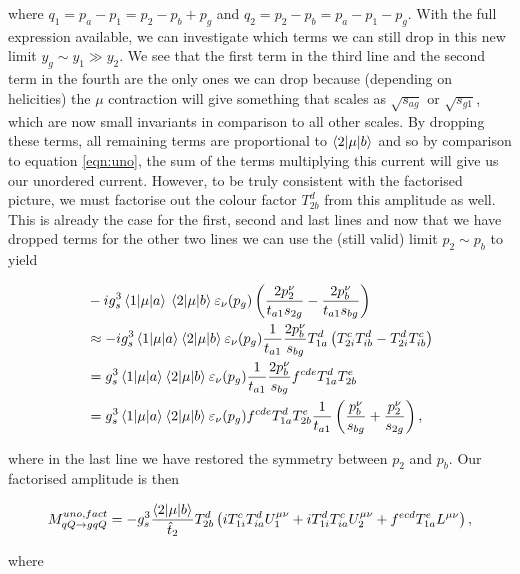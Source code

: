 where $q_1 = p_a - p_1 = p_2 - p_b + p_g$ and $q_2 = p_2 - p_b = p_a - p_1 - p_g$. With the full expression available, we can investigate which terms we can still drop in this new limit $y_g \sim y_1 \gg y_2$. We see that the first term in the third line and the second term in the fourth are the only ones we can drop because (depending on helicities) the $\mu$ contraction will give something that scales as $\sqrt{s_{ag}}$ or $\sqrt{s_{g1}}$, which are now small invariants in comparison to all other scales. By dropping these terms, all remaining terms are proportional to $\mathinner{\langle2\vert\mu\vert b\rangle}_{}$ and so by comparison to equation \ref{eqn:uno}, the sum of the terms multiplying this current will give us our unordered current. However, to be truly consistent with the factorised picture, we must factorise out the colour factor $T^d_{2b}$ from this amplitude as well. This is already the case for the first, second and last lines and now that we have dropped terms for the other two lines we can use the (still valid) limit $p_2 \sim p_b$ to yield

\begin{equation}
\begin{split}
& -ig_s^3 \mathinner{\langle1\vert\mu\vert a\rangle}_{}{} \mathinner{\langle2\vert\mu\vert b\rangle}_{} \varepsilon_\nu(p_g) \left(\frac{2p_2^\nu}{t_{a1} s_{2g}} - \frac{2p_b^\nu}{t_{a1} s_{bg}} \right) \\
& \approx -i g_s^3 \mathinner{\langle1\vert\mu\vert a\rangle}_{} \mathinner{\langle2\vert\mu\vert b\rangle}_{} \varepsilon_\nu(p_g) \frac{1}{t_{a1}}\frac{2p_b^\nu}{s_{bg}} T^d_{1a}\left(T^c_{2i}T^d_{ib} - T^d_{2i}T^c_{ib}\right)  \\
&= g_s^3 \mathinner{\langle1\vert\mu\vert a\rangle}_{} \mathinner{\langle2\vert\mu\vert b\rangle}_{} \varepsilon_\nu(p_g) \frac{1}{t_{a1}} \frac{2 p_b^\nu}{s_{bg}} f^{cde}T^d_{1a}T^e_{2b} \\
&= g_s^3 \mathinner{\langle1\vert\mu\vert a\rangle}_{} \mathinner{\langle2\vert\mu\vert b\rangle}_{} \varepsilon_\nu(p_g) f^{cde}T^d_{1a}T^e_{2b} \frac{1}{t_{a1}} \left(\frac{p_b^\nu}{s_{bg}}+\frac{p_2^\nu}{s_{2g}} \right),
\end{split}
\end{equation}

where in the last line we have restored the symmetry between $p_2$ and $p_b$. Our factorised amplitude is then

\begin{equation}
M_{qQ \to gqQ}^{uno, fact} = -g_s^3 \frac{\mathinner{\langle2\vert\mu\vert b\rangle}_{}}{\hat{t}_2}T_{2b}^d \left(iT^c_{1i}T^d_{ia}U_1^{\mu \nu} + iT^d_{1i}T^c_{ia}U_2^{\mu \nu} + f^{ecd}T^e_{1a}L^{\mu \nu} \right),
\end{equation}

where

